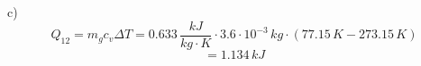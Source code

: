 c) 
\[
Q_{12} = m_{g} c_{v} \Delta T = 0.633 \, \frac{kJ}{kg \cdot K} \cdot 3.6 \cdot 10^{-3} \, kg \cdot (77.15 \, K - 273.15 \, K)
\]
\[
= 1.134 \, kJ
\]